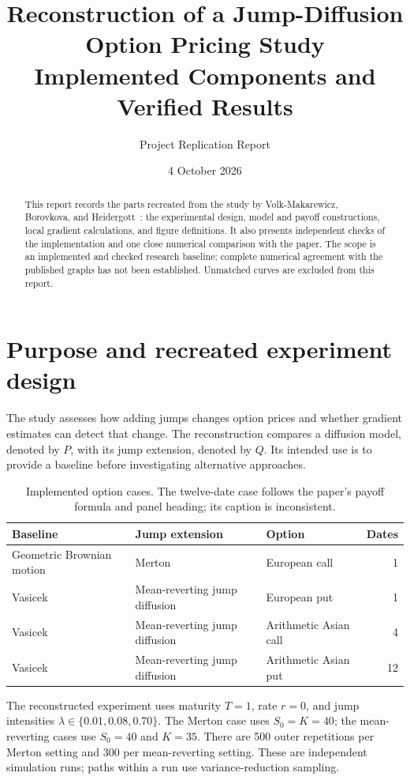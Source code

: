 \documentclass[11pt,a4paper]{article}
\title{Reconstruction of a Jump-Diffusion Option Pricing Study\\[4pt]
\large Implemented Components and Verified Results}
\author{Project Replication Report}
\date{4 October 2026}
\begin{document}
\maketitle
\vspace{-10mm}
\begin{abstract}
This report records the parts recreated from the study by
Volk-Makarewicz, Borovkova, and Heidergott~\cite{paper}: the experimental
design, model and payoff constructions, local gradient calculations,
and figure definitions. It also presents independent checks of the
implementation and one close numerical comparison with the paper.
The scope is an implemented and checked research baseline; complete
numerical agreement with the published graphs has not been established.
Unmatched curves are excluded from this report.
\end{abstract}

\section{Purpose and recreated experiment design}
The study assesses how adding jumps changes option prices and whether
gradient estimates can detect that change. The reconstruction compares
a diffusion model, denoted by $P$, with its jump extension, denoted by $Q$.
Its intended use is to provide a baseline before investigating alternative
approaches.

\begin{table}[h]
\centering\small
\begin{tabular}{@{}p{39mm}p{38mm}p{46mm}r@{}}
\toprule
Baseline & Jump extension & Option & Dates\\
\midrule
Geometric Brownian motion & Merton & European call & 1\\
Vasicek & Mean-reverting jump diffusion & European put & 1\\
Vasicek & Mean-reverting jump diffusion & Arithmetic Asian call & 4\\
Vasicek & Mean-reverting jump diffusion & Arithmetic Asian put & 12\\
\bottomrule
\end{tabular}
\caption{Implemented option cases. The twelve-date case follows the
paper's payoff formula and panel heading; its caption is inconsistent.}
\end{table}

The reconstructed experiment uses maturity $T=1$, rate $r=0$, and jump
intensities $\lambda\in\{0.01,0.08,0.70\}$. The Merton case uses
$S_0=K=40$; the mean-reverting cases use $S_0=40$ and $K=35$.
There are 500 outer repetitions per Merton setting and 300 per
mean-reverting setting. These are independent simulation runs; paths
within a run use variance-reduction sampling.
\end{document}
